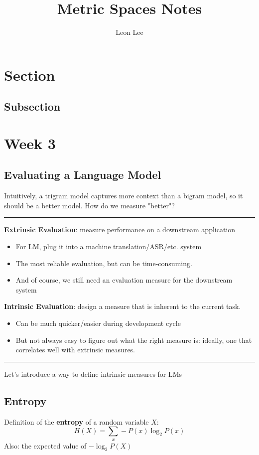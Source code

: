 \documentclass{article}
\title{Metric Spaces Notes}
\author{Leon Lee}
\begin{document}
\maketitle
\newpage
\tableofcontents
\newpage

\section{Section}
\subsection{Subsection}


\section{Week 3}
\subsection{Evaluating a Language Model}
Intuitively, a trigram model captures more context than a bigram model, so it should be a better model. How do we measure "better"?

\noindent\rule{\textwidth}{0.2pt}
\textbf{Extrinsic Evaluation}: measure performance on a downstream application
\begin{itemize}
    \item For LM, plug it into a machine translation/ASR/etc. system
    \item The most reliable evaluation, but can be time-consuming.
    \item And of course, we still need an evaluation measure for the downstream system
\end{itemize}
\textbf{Intrinsic Evaluation}: design a measure that is inherent to the current task.
\begin{itemize}
    \item Can be much quicker/easier during development cycle 
    \item But not always easy to figure out what the right measure is: ideally, one that correlates well with extrinsic measures.
\end{itemize}
\noindent\rule{\textwidth}{0.2pt}
Let's introduce a way to define intrinsic measures for LMs
\subsection{Entropy}
Definition of the \textbf{entropy} of a random variable $X$:
\[H(X) = \sum_{x} - P(x) \log_{2} P(x)\]
Also: the expected value of $-\log_{2} P(X)$
\end{document}
